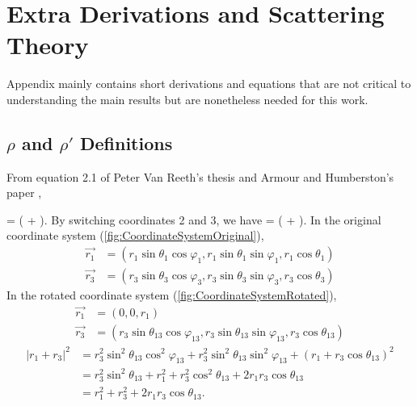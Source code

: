 \documentclass[Dissertation.tex]{subfiles}
\begin{document}
\chapter{Extra Derivations and Scattering Theory}
\label{chp:ExtraDer}

\iftoggle{UNT}{This}{\lettrine{\textcolor{startcolor}{T}}{his}}
Appendix mainly contains short derivations and equations that are not 
critical to understanding the main results but are nonetheless needed for 
this work.

\section{\texorpdfstring{$\rho$ and $\rho'$} {rho and rho'} Definitions}
\label{sec:RhoDef}
From equation 2.1 of Peter Van Reeth's thesis \cite{VanReethThesis} and Armour and Humberston's paper \cite{Armour1991},

\beq
\vec{\rho} =  \left(  +  \right).
\label{eq:RhoDef1}
\eeq
By switching coordinates 2 and 3, we have
\beq
{} =  \left(  +  \right).
\label{eq:RhoDef2}
\eeq
In the original coordinate system (\cref{fig:CoordinateSystemOriginal}),
\begin{align}
\nonumber \vec{r_1} &= \left( r_1 \sin \theta_1 \cos \varphi_1, r_1 \sin \theta_1 \sin \varphi_1, r_1 \cos \theta_1 \right) \\
\vec{r_3} &= \left( r_3 \sin \theta_3 \cos \varphi_3, r_3 \sin \theta_3 \sin \varphi_3, r_3 \cos \theta_3 \right)
\end{align}
In the rotated coordinate system (\cref{fig:CoordinateSystemRotated}),
\begin{align}
\nonumber \vec{r_1} &= (0, 0, r_1) \\
\vec{r_3} &= \left( r_3 \sin \theta_{13} \cos \varphi_{13}, r_3 \sin \theta_{13} \sin \varphi_{13}, r_3 \cos \theta_{13} \right)
\end{align}
\begin{align}
\nonumber \left| r_1 + r_3 \right|^2 &= r_3^2 \sin^2 \theta_{13} \cos^2 \varphi_{13} + r_3^2 \sin^2 \theta_{13} \sin^2 \varphi_{13} + (r_1 + r_3 \cos \theta_{13})^2\\
\nonumber &= r_3^2 \sin^2 \theta_{13} + r_1^2 + r_3^2 \cos^2 \theta_{13} + 2 r_1 r_3 \cos \theta_{13} \\
&= r_1^2 + r_3^2 + 2 r_1 r_3 \cos \theta_{13}.
\label{eq:RhoDef3}
\end{align}
\end{document}
